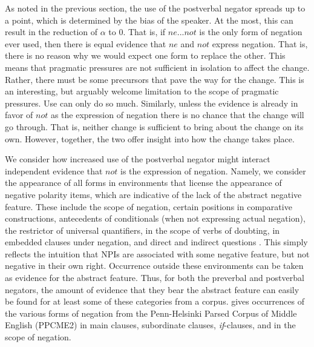 \documentclass[12pt]{article}
\theoremstyle{definition} \newtheorem{definition}{Definition}
\begin{document}
As noted in the previous section, the use of the postverbal negator spreads up to a point, which is determined by the bias of the speaker. At the most, this can result in the reduction of $\alpha$ to $0$. That is, if $ne...not$ is the only form of negation ever used, then there is equal evidence that $ne$ and $not$ express negation. That is, there is no reason why we would expect one form to replace the other. This means that pragmatic pressures are not sufficient in isolation to affect the change. Rather, there must be some precursors that pave the way for the change. This is an interesting, but arguably welcome limitation to the scope of pragmatic pressures. Use can only do so much.  Similarly, unless the evidence is already in favor of $not$ as the expression of negation there is no chance that the change will go through. That is, neither change is sufficient to bring about the change on its own. However, together, the two offer insight into how the change takes place.

We consider how increased use of the postverbal negator might interact independent evidence that $not$ is the expression of negation. Namely, we consider the appearance of all forms in environments that license the appearance of negative polarity items, which are indicative of the lack of the abstract negative feature. These include the scope of negation, certain positions in comparative constructions, antecedents of conditionals (when not expressing actual negation), the restrictor of universal quantifiers, in the scope of verbs of doubting, in embedded clauses under negation, and direct and indirect questions \citep{ladusaw1979, giannakidou1998}. This simply reflects the intuition that NPIs are associated with some negative feature, but not negative in their own right. Occurrence outside these environments can be taken as evidence for the abstract feature. Thus, for both the preverbal and postverbal negators, the amount of evidence that they bear the abstract feature can easily be found for at least some 
of these categories from a corpus. \cite{wallage2008} gives occurrences of the various forms of negation from the Penn-Helsinki Parsed Corpus of Middle English (PPCME2) \citep{ppcme2}  in main clauses, subordinate clauses, \emph{if}-clauses, and in the scope of negation.
\end{document}
